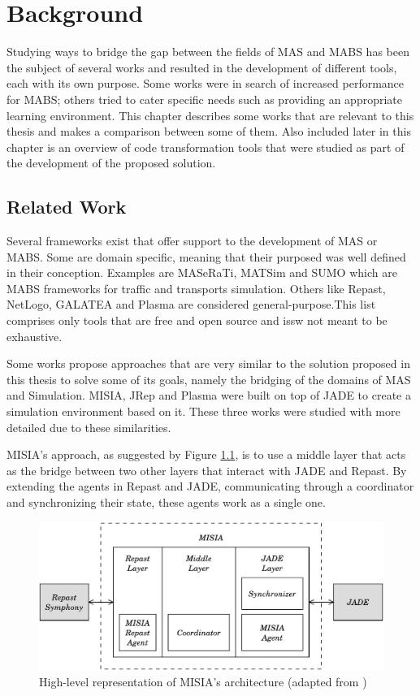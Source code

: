 \chapter{Background}
\label{chap:background}


Studying ways to bridge the gap between the fields of \gls{MAS} and \gls{MABS} has been the subject of several works and resulted in the development of different tools, each with its own purpose. Some works were in search of increased performance for MABS; others tried to cater specific needs such as providing an appropriate learning environment. This chapter describes some works that are relevant to this thesis and makes a comparison between some of them. Also included later in this chapter is an overview of code transformation tools that were studied as part of the development of the proposed solution.

\section{Related Work}
Several frameworks exist that offer support to the development of MAS or MABS. Some are domain specific, meaning that their purposed was well defined in their conception. Examples are MASeRaTi\cite{ahlbrecht2014scalable}, MATSim\cite{balmer2008agent} and SUMO\cite{SUMO2012} which are MABS frameworks for traffic and transports simulation. Others like Repast\cite{collier2003repast}, NetLogo\cite{tisue2004netlogo}, GALATEA\cite{davila2000galatea} and Plasma\cite{warden2010towards} are considered general-purpose.This list comprises only tools that are free and open source and issw not meant to be exhaustive.

Some works propose approaches that are very similar to the solution proposed in this thesis to solve some of its goals, namely the bridging of the domains of MAS and Simulation. MISIA, JRep and Plasma were built on top of JADE to create a simulation environment based on it. These three works were studied with more detailed due to these similarities.

MISIA's approach, as suggested by Figure \ref{fig:misia}, is to use a middle layer that acts as the bridge between two other layers that interact with JADE and Repast. By extending the agents in Repast and JADE, communicating through a coordinator and synchronizing their state, these agents work as a single one.

\begin{figure}[h]
	\centering
	\includegraphics[width=0.75\linewidth]{figures/MISIA.pdf}
	\caption{High-level representation of MISIA's architecture (adapted from \cite{garcia2011misia})}
	\label{fig:misia}
\end{figure}

